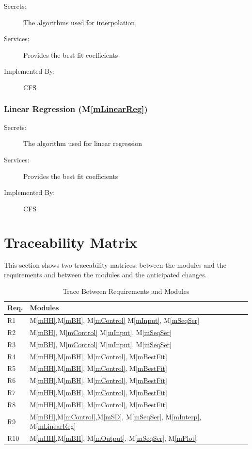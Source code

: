 \documentclass[12pt, titlepage]{article}
\newcommand{\mref}[1]{M\ref{#1}}
\newcommand{\famname}{CFS} %
\begin{document}
\begin{description}
	\item[Secrets:] The algorithms used for interpolation
	\item[Services:] Provides the best fit coefficients
	\item[Implemented By:] \famname{}
\end{description}

\subsubsection{Linear Regression (\mref{mLinearReg})}

\begin{description}
	\item[Secrets:] The algorithm used for linear regression
	\item[Services:] Provides the best fit coefficients
	\item[Implemented By:] \famname{}
\end{description}

\section{Traceability Matrix} \label{SecTM}

This section shows two traceability matrices: between the modules and the
requirements and between the modules and the anticipated changes.

\begin{table}[H]
\centering
\begin{tabular}{p{} p{}}
\toprule
\textbf{Req.} & \textbf{Modules}\\
\midrule
R1 & \mref{mHH},\mref{mBH}, \mref{mControl} \mref{mInput}, \mref{mSeqSer} \\
R2 & \mref{mBH}, \mref{mControl} \mref{mInput}, \mref{mSeqSer}\\
R3 & \mref{mBH}, \mref{mControl} \mref{mInput}, \mref{mSeqSer}\\
R4 & \mref{mHH},\mref{mBH}, \mref{mControl}, \mref{mBestFit}\\
R5 & \mref{mHH},\mref{mBH}, \mref{mControl}, \mref{mBestFit}\\ 
R6 & \mref{mHH},\mref{mBH}, \mref{mControl}, \mref{mBestFit}\\
R7 & \mref{mHH},\mref{mBH}, \mref{mControl}, \mref{mBestFit}\\
R8 & \mref{mHH},\mref{mBH}, \mref{mControl}, \mref{mBestFit}\\
R9 & \mref{mBH},\mref{mControl},\mref{mSD}, \mref{mSeqSer}, \mref{mInterp}, \mref{mLinearReg}\\
R10 & \mref{mHH},\mref{mBH}, \mref{mOutput}, \mref{mSeqSer}, \mref{mPlot}\\

\bottomrule
\end{tabular}
\caption{Trace Between Requirements and Modules}
\label{TblRT}
\end{table}
\end{document}
